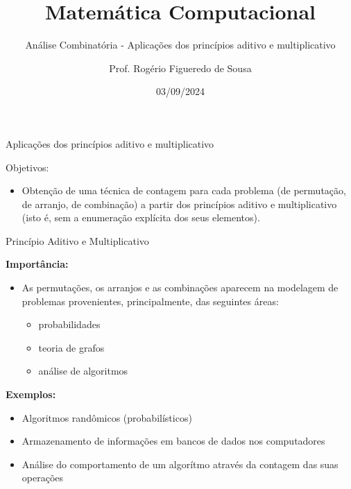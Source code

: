 \documentclass[aspectratio=169]{beamer}
\title{Matemática Computacional}
\subtitle{Análise Combinatória - Aplicações dos princípios aditivo e
multiplicativo}
\author{Prof. Rogério Figueredo de Sousa}
\institute{%
\href{rogerio.sousa@ifpi.edu.br}{rogerio.sousa@ifpi.edu.br}%
}%
\date{03/09/2024}
\begin{document}
\begin{frame}[plain]
    \titlepage
\end{frame}




\jsonp
{}

\begin{frame}{Aplicações dos princípios aditivo e multiplicativo}

    Objetivos:

    \vspace{4mm}
    \begin{itemize}
        \item Obtenção de uma técnica de contagem para cada problema (de permutação, de arranjo, de combinação) a partir dos princípios aditivo e multiplicativo (isto é, sem a enumeração explícita dos seus elementos).
    \end{itemize}

\end{frame}

\begin{frame}{Princípio Aditivo e Multiplicativo}

    \textbf{Importância:}

    \vspace{4mm}
    \begin{itemize}
        \item As permutações, os arranjos e as combinações aparecem na modelagem de problemas provenientes, principalmente, das seguintes áreas:
        \begin{itemize}
            \item probabilidades
            \item teoria de grafos
            \item análise de algoritmos
        \end{itemize}
    \end{itemize}

    \vspace{4mm}
    \textbf{Exemplos:}
    \begin{itemize}
        \item Algoritmos randômicos (probabilísticos)
        \item Armazenamento de informações em bancos de dados nos computadores
        \item Análise do comportamento de um algorítmo através da contagem das suas operações
    \end{itemize}

\end{frame}
\end{document}
